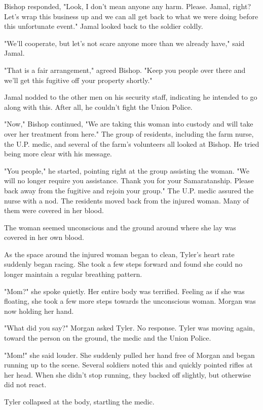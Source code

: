 \documentclass[courier]{sffms}
\begin{document}
Bishop responded, "Look, I don't mean anyone
any harm. Please. Jamal, right? Let's wrap this
business up and we can all get back to what we
were doing before this unfortunate event." Jamal
looked back to the soldier coldly.

"We'll cooperate, but let's not scare anyone
more than we already have," said Jamal.

"That is a fair arrangement," agreed Bishop.
"Keep you people over there and we'll get this
fugitive off your property shortly."

Jamal nodded to the other men on his security
staff, indicating he intended to go along with
this. After all, he couldn't fight the Union Police.

"Now," Bishop continued, "We are taking this
woman into custody and will take over her
treatment from here." The group of residents,
including the farm nurse, the U.P. medic, and
several of the farm's volunteers all looked at
Bishop. He tried being more clear with his
message.

"You people," he started, pointing right at
the group assisting the woman. "We will no
longer require you assistance. Thank you for 
your Samaratanship. Please back away from
the fugitive and rejoin your group." The U.P.
medic assured the nurse with a nod. The
residents moved back from the injured woman.
Many of them were covered in her blood.

The woman seemed unconscious and the
ground around where she lay was covered in
her own blood.

As the space around the injured woman
began to clean, Tyler's heart rate suddenly
began racing. She took a few steps forward
and found she could no longer maintain
a regular breathing pattern.

"Mom?" she spoke quietly. Her entire body
was terrified. Feeling as if she was floating,
she took a few more steps towards the
unconscious woman. Morgan was now holding
her hand.

"What did you say?" Morgan asked Tyler.
No response. Tyler was moving again,
toward the person on the ground, the medic
and the Union Police.

"Mom!" she said louder. She suddenly pulled
her hand free of Morgan and began running
up to the scene. Several soldiers noted this
and quickly pointed rifles at her head. When
she didn't stop running, they backed off
slightly, but otherwise did not react.

Tyler collapsed at the body, startling the medic.
\end{document}
